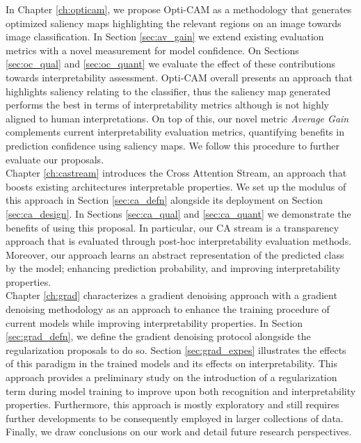\noindent In Chapter \ref{ch:opticam}, we propose Opti-CAM as a methodology that generates 
optimized saliency maps highlighting the relevant regions on an image towards image classification. 
In Section \ref{sec:av_gain} we extend existing evaluation metrics with a novel measurement for 
model confidence. On Sections \ref{sec:oc_qual} and \ref{sec:oc_quant} we evaluate the effect of 
these contributions towards interpretability assessment. Opti-CAM overall presents an approach that 
highlights saliency relating to the classifier, thus the saliency map generated performs the best 
in terms of interpretability metrics although is not highly aligned to human interpretations. 
On top of this, our novel metric \emph{Average Gain} complements current interpretability evaluation 
metrics, quantifying benefits in prediction confidence using saliency maps. We follow this 
procedure to further evaluate our proposals.\\


\noindent Chapter \ref{ch:castream} introduces the Cross Attention Stream, an approach that boosts 
existing architectures interpretable properties. We set up the modulus of this approach in 
Section \ref{sec:ca_defn} alongside its deployment on Section \ref{sec:ca_design}. 
In Sections \ref{sec:ca_qual} and \ref{sec:ca_quant} we demonstrate the benefits of using this
proposal. In particular, our CA stream is a transparency approach that is evaluated through 
post-hoc interpretability evaluation methods. Moreover, our approach learns an abstract 
representation of the predicted class by the model; enhancing prediction probability, and improving 
interpretability properties.\\

\noindent Chapter \ref{ch:grad} characterizes a gradient denoising approach with a gradient denoising 
methodology as an approach to enhance the training procedure of current models while improving 
interpretability properties. In Section \ref{sec:grad_defn}, we define the gradient denoising 
protocol alongside the regularization proposals to do so.
Section \ref{sec:grad_expes} illustrates the effects of this paradigm
in the trained models and its effects on interpretability. This approach provides a preliminary 
study on the introduction of a regularization term during model training to improve upon both 
recognition and interpretability properties. Furthermore, this approach is mostly exploratory and 
still requires further developments to be consequently employed in larger collections of data.\\
    
\noindent Finally, we draw conclusions on our work and detail future research perspectives.